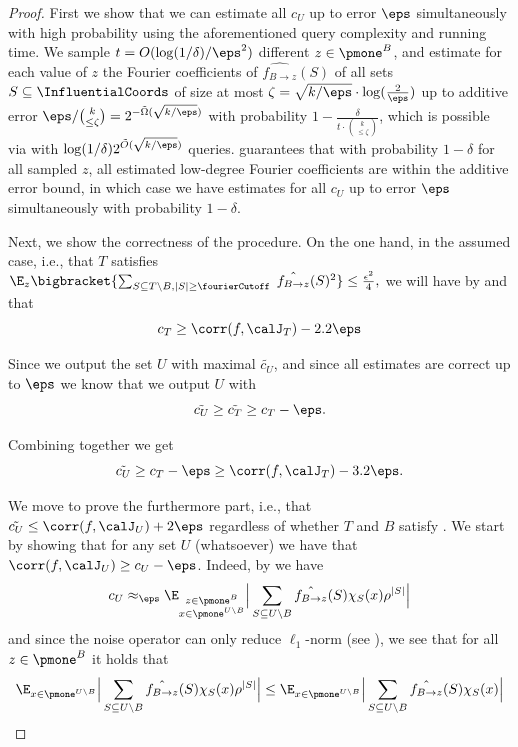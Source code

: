 \begin{proof}
First we show that we can estimate all ${c_U}$ up to error $\eps$ simultaneously with high probability using the aforementioned query complexity and running time.
We sample $t = O(\log(1/\delta)/\eps^2)$ different $z\in \pmone^B$, and estimate for each value of $z$ the Fourier coefficients of $\hat{f_{B \to z}}(S)$ of all sets $S \subseteq \InfluentialCoords$ of size at most $\zeta = \sqrt{k/\eps} \cdot \log(\tfrac{2}{\eps})$ up to additive error $\eps/\binom{k}{\le \zeta} = 2^{-\tilde{\Omega}(\sqrt{k/\eps})}$ with probability $1- \frac{\delta}{t\cdot \binom{k}{\leq \zeta}}$, which is possible via  with $\log(1/\delta)2^{\tilde{O}(\sqrt{k/\eps})}$ queries. 
 guarantees that with probability $1-\delta$ for all sampled $z$, all estimated low-degree Fourier coefficients are within the additive error bound, in which case we have estimates for all $c_U$ up to error $\eps$ simultaneously with probability $1-\delta$.

Next, we show the correctness of the procedure.
On the one hand, in the assumed case, i.e., that $T$ satisfies $\E_z\bigbracket{\sum_{\substack{S \subseteq T \setminus B,  |S| \geq \fourierCutoff}} \;\hat{f_{B \to z}}(S)^2} \leq \frac{\epsilon^2}{4},$
we will have by   and  that \begin{equation}\label{eq:ct:lb}c_T \ge  \corr(f, \calJ_T) - 2.2 \eps\end{equation}


     
    Since we output the set $U$ with maximal $\tilde{c_U}$, and since all estimates are correct up to $\eps$ 
    we know that we output $U$ with \begin{equation}\label{eq:cu:ct}\tilde{c_U} \ge \tilde{c_T} \ge c_T-\eps.\end{equation}
     
  Combining  together we get $$\tilde{c_U}  \ge c_T - \eps \ge  \corr(f, \calJ_T) - 3.2\eps.$$
  
  We move to prove the furthermore part, i.e., that $\tilde{c_U} \le \corr(f,\calJ_U) + 2\eps$ regardless of whether $T$ and $B$ satisfy .
  We start by showing that for any set $U$ (whatsoever) we have that $\corr(f,\calJ_U) \ge c_U - \eps$.
Indeed, by  we have $${c_U} \approx_{\eps}\E_{\substack{z \in \pmone^{B}\\x \in \pmone^{U \setminus B}}}
     \Big | \sum_{S \subseteq U\setminus B} \hat{f_{B \to z}}(S)\chi_S(x)\rho^{|S|}\Big|$$ and since the noise operator can only reduce $\ell_1$-norm (see ), we see that for all $z\in \pmone^{B}$ it holds that
     $$
     \E_{x \in \pmone^{U \setminus B}}
     \Big | \sum_{S \subseteq U\setminus B} \hat{f_{B \to z}}(S)\chi_S(x)\rho^{|S|}\Big| \le 
     \E_{x \in \pmone^{U \setminus B}}
     \Big | \sum_{S \subseteq U\setminus B} \hat{f_{B \to z}}(S)\chi_S(x)\Big|
     $$
     

\end{proof}
